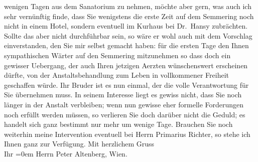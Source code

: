 \begin{ledgroupsized}[t]{13cm}
                    wenigen Tagen aus dem Sanatorium zu nehmen, möchte aber gern, was auch ich sehr vernünftig
                    finde, dass Sie wenigstens die erste Zeit auf dem Semmering noch nicht in einem Hotel, sondern eventuell im Kurhaus bei Dr. Hansy zubrächten. Sollte das aber nicht durchführbar sein, so wäre er
                    wohl auch mit dem Vorschlag einverstanden, den Sie mir selbst gemacht haben: für
                    die ersten Tage den Ihnen sympathischen Wärter auf den Semmering mitzunehmen {\pb}so dass doch ein
                    gewisser Uebergang, der auch Ihren jetzigen Aerzten wünschenswert erscheinen
                    dürfte, von der Anstaltsbehandlung zum Leben in vollkommener Freiheit geschaffen
                    würde. Ihr Bruder ist es
                    nun einmal, der die volle Verantwortung für Sie übernehmen muss. In seinem
                    Interesse liegt es gewiss nicht, dass Sie noch länger in der Anstalt verbleiben;
                    wenn nun gewisse eher formelle Forderungen noch erfüllt werden müssen, so
                    verlieren Sie doch darüber nicht die Geduld; es handelt sich ganz bestimmt nur
                    mehr um wenige Tage. Brauchen Sie noch weiterhin meine Intervention eventuell
                    bei Herrn Primarius Richter, so stehe ich
                    Ihnen ganz zur Verfügung.\pend
           \pstart
           Mit herzlichem Gruss{\\[\baselineskip]}Ihr \pend
           \leftskip=0em{}\pstart
           \noindent{}Herrn Peter Altenberg, Wien.\pend
                     \endnumbering{}\end{ledgroupsized}  \newcommand{\dateiname}{L02128}\newcommand{\titel}{Arthur Schnitzler an Peter Altenberg, 22. 4. 1913}\newcommand{\editorInnen}{Martin Anton Müller und Gerd-Hermann Susen}
      